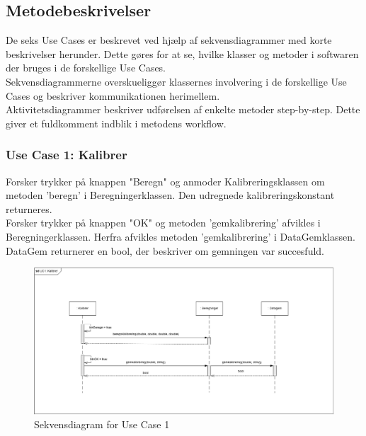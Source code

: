 \subsection{Metodebeskrivelser}

De seks Use Cases er beskrevet ved hjælp af sekvensdiagrammer med korte beskrivelser herunder. Dette gøres for at se, hvilke klasser og metoder i softwaren der bruges i de forskellige Use Cases.\\
Sekvensdiagrammerne overskueliggør klassernes involvering i de forskellige Use Cases og beskriver kommunikationen herimellem.\\
Aktivitetsdiagrammer beskriver udførelsen af enkelte metoder step-by-step. Dette giver et fuldkomment indblik i metodens workflow.


\subsubsection{Use Case 1: Kalibrer}
Forsker trykker på knappen "Beregn"\- og anmoder Kalibreringsklassen om metoden 'beregn' i Beregningerklassen. Den udregnede kalibreringskonstant returneres.\\
Forsker trykker på knappen "OK"\- og metoden 'gemkalibrering' afvikles i Beregningerklassen. Herfra afvikles metoden 'gemkalibrering' i DataGemklassen. DataGem returnerer en bool, der beskriver om gemningen var succesfuld.
\begin{figure}[H]
	\centering
	\includegraphics[width=1\textwidth]{Figurer/UC1_SD_SW}
	\caption{Sekvensdiagram for Use Case 1}
\end{figure}

